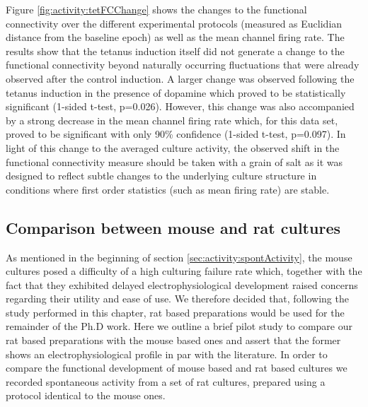            Figure \ref{fig:activity:tetFCChange} shows the changes to the functional connectivity over the different experimental protocols (measured as Euclidian distance from the baseline epoch) as well as the mean channel firing rate. The results show that the tetanus induction itself did not generate a change to the functional connectivity beyond naturally occurring fluctuations that were already observed after the control induction. A larger change was observed following the tetanus induction in the presence of dopamine which proved to be statistically significant (1-sided t-test, p=0.026). However, this change was also accompanied by a strong decrease in the mean channel firing rate which, for this data set, proved to be significant with only 90\% confidence (1-sided t-test, p=0.097). In light of this change to the averaged culture activity, the observed shift in the functional connectivity measure should be taken with a grain of salt as it was designed to reflect subtle changes to the underlying culture structure in conditions where first order statistics (such as mean firing rate) are stable.


  \subsection{Comparison between mouse and rat cultures}
    \label{sec:activity:mouseRatComp}
    As mentioned in the beginning of section \ref{sec:activity:spontActivity}, the mouse cultures posed a difficulty of a high culturing failure rate which, together with the fact that they exhibited delayed electrophysiological development raised concerns regarding their utility and ease of use. We therefore decided that, following the study performed in this chapter, rat based preparations would be used for the remainder of the Ph.D work. Here we outline a brief pilot study to compare our rat based preparations with the mouse based ones and assert that the former shows an electrophysiological profile in par with the literature. In order to compare the functional development of mouse based and rat based cultures we recorded spontaneous activity from a set of rat cultures, prepared using a protocol identical to the mouse ones.

